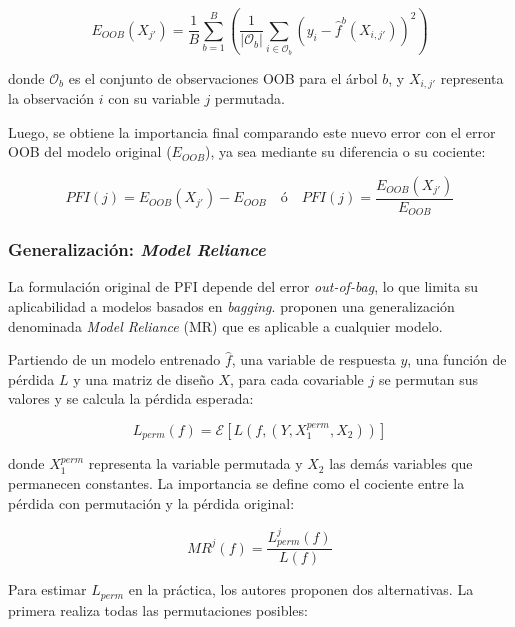 \begin{equation}
    E_{OOB}(X_{j'}) = \frac{1}{B} \sum_{b=1}^{B} \left( \frac{1}{|\mathcal{O}_b|} \sum_{i \in \mathcal{O}_b} \left( y_i - \hat{f}^b(X_{i,j'}) \right)^2 \right)
\end{equation}

donde $\mathcal{O}_b$ es el conjunto de observaciones OOB para el árbol $b$, y $X_{i,j'}$ representa la observación $i$ con su variable $j$ permutada.

Luego, se obtiene la importancia final comparando este nuevo error con el error OOB del modelo original ($E_{OOB}$), ya sea mediante su diferencia o su cociente:

\begin{equation}
    PFI(j) = E_{OOB}(X_{j'}) - E_{OOB} \quad \text{ó} \quad PFI(j) = \frac{E_{OOB}(X_{j'})}{E_{OOB}}
\end{equation}

\subsubsection{Generalización: \textit{Model Reliance}}

La formulación original de PFI depende del error \textit{out-of-bag}, lo que limita su aplicabilidad a modelos basados en \textit{bagging}. \cite{fischer_2019} proponen una generalización denominada \textit{Model Reliance} (MR) que es aplicable a cualquier modelo.

Partiendo de un modelo entrenado $\hat{f}$, una variable de respuesta $y$, una función de pérdida $L$ y una matriz de diseño $X$, para cada covariable $j$ se permutan sus valores y se calcula la pérdida esperada:

\begin{equation}
L_{perm}(f)= \mathcal{E}[L(f,(Y,X_1^{perm},X_2))]    
\end{equation}

donde $X_1^{perm}$ representa la variable permutada y $X_2$ las demás variables que permanecen constantes. La importancia se define como el cociente entre la pérdida con permutación y la pérdida original:

\begin{equation}
MR^{j}(f)=\frac{L^{j}_{perm}(f)}{L(f)}    
\end{equation}

Para estimar $L_{perm}$ en la práctica, los autores proponen dos alternativas. La primera realiza todas las permutaciones posibles:

